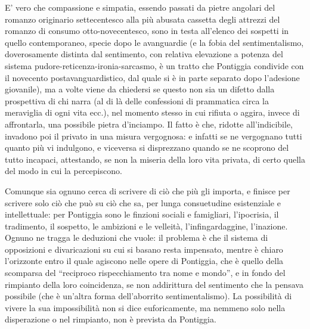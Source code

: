 E’ vero che compassione e simpatia, essendo passati da pietre angolari del romanzo originario settecentesco alla più abusata cassetta degli attrezzi del romanzo di consumo otto-novecentesco, sono in testa all’elenco dei sospetti in quello contemporaneo, specie dopo le avanguardie (e la fobia del sentimentalismo, doverosamente distinta dal sentimento, con relativa elevazione a potenza del sistema pudore-reticenza-ironia-sarcasmo, è un tratto che Pontiggia condivide con il novecento postavanguardistico, dal quale si è in parte separato dopo l’adesione giovanile), ma a volte viene da chiedersi se questo non sia un difetto dalla prospettiva di chi narra (al di là delle confessioni di prammatica circa la meraviglia di ogni vita ecc.), nel momento stesso in cui rifiuta o aggira, invece di affrontarla, una possibile pietra d’inciampo. Il fatto è che, ridotte all’indicibile, invadono poi il privato in una misura vergognosa: e infatti se ne vergognano tutti quanto più vi indulgono, e viceversa si disprezzano quando se ne scoprono del tutto incapaci, attestando, se non la miseria della loro vita privata, di certo quella del modo in cui la percepiscono.

Comunque sia ognuno cerca di scrivere di ciò che più gli importa, e finisce per scrivere solo ciò che può su ciò che sa, per lunga consuetudine esistenziale e intellettuale: per Pontiggia sono le finzioni sociali e famigliari, l’ipocrisia, il tradimento, il sospetto, le ambizioni e le velleità, l’infingardaggine, l’inazione. Ognuno ne tragga le deduzioni che vuole: il problema è che il sistema di opposizioni e divaricazioni su cui si basano resta impensato, mentre è chiaro l’orizzonte entro il quale agiscono nelle opere di Pontiggia, che è quello della scomparsa del “reciproco rispecchiamento tra nome e mondo”, e in fondo del rimpianto della loro coincidenza, se non addirittura del sentimento che la pensava possibile (che è un’altra forma dell’aborrito sentimentalismo). La possibilità di vivere la sua impossibilità non si dice euforicamente, ma nemmeno solo nella disperazione o nel rimpianto, non è prevista da Pontiggia.

